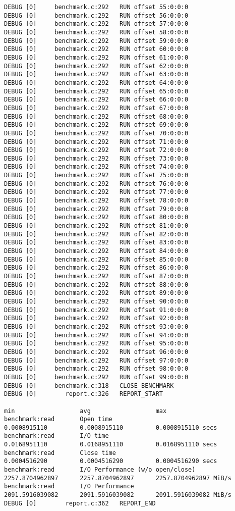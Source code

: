 \begin{verbatim}
DEBUG [0]     benchmark.c:292   RUN offset 55:0:0:0
DEBUG [0]     benchmark.c:292   RUN offset 56:0:0:0
DEBUG [0]     benchmark.c:292   RUN offset 57:0:0:0
DEBUG [0]     benchmark.c:292   RUN offset 58:0:0:0
DEBUG [0]     benchmark.c:292   RUN offset 59:0:0:0
DEBUG [0]     benchmark.c:292   RUN offset 60:0:0:0
DEBUG [0]     benchmark.c:292   RUN offset 61:0:0:0
DEBUG [0]     benchmark.c:292   RUN offset 62:0:0:0
DEBUG [0]     benchmark.c:292   RUN offset 63:0:0:0
DEBUG [0]     benchmark.c:292   RUN offset 64:0:0:0
DEBUG [0]     benchmark.c:292   RUN offset 65:0:0:0
DEBUG [0]     benchmark.c:292   RUN offset 66:0:0:0
DEBUG [0]     benchmark.c:292   RUN offset 67:0:0:0
DEBUG [0]     benchmark.c:292   RUN offset 68:0:0:0
DEBUG [0]     benchmark.c:292   RUN offset 69:0:0:0
DEBUG [0]     benchmark.c:292   RUN offset 70:0:0:0
DEBUG [0]     benchmark.c:292   RUN offset 71:0:0:0
DEBUG [0]     benchmark.c:292   RUN offset 72:0:0:0
DEBUG [0]     benchmark.c:292   RUN offset 73:0:0:0
DEBUG [0]     benchmark.c:292   RUN offset 74:0:0:0
DEBUG [0]     benchmark.c:292   RUN offset 75:0:0:0
DEBUG [0]     benchmark.c:292   RUN offset 76:0:0:0
DEBUG [0]     benchmark.c:292   RUN offset 77:0:0:0
DEBUG [0]     benchmark.c:292   RUN offset 78:0:0:0
DEBUG [0]     benchmark.c:292   RUN offset 79:0:0:0
DEBUG [0]     benchmark.c:292   RUN offset 80:0:0:0
DEBUG [0]     benchmark.c:292   RUN offset 81:0:0:0
DEBUG [0]     benchmark.c:292   RUN offset 82:0:0:0
DEBUG [0]     benchmark.c:292   RUN offset 83:0:0:0
DEBUG [0]     benchmark.c:292   RUN offset 84:0:0:0
DEBUG [0]     benchmark.c:292   RUN offset 85:0:0:0
DEBUG [0]     benchmark.c:292   RUN offset 86:0:0:0
DEBUG [0]     benchmark.c:292   RUN offset 87:0:0:0
DEBUG [0]     benchmark.c:292   RUN offset 88:0:0:0
DEBUG [0]     benchmark.c:292   RUN offset 89:0:0:0
DEBUG [0]     benchmark.c:292   RUN offset 90:0:0:0
DEBUG [0]     benchmark.c:292   RUN offset 91:0:0:0
DEBUG [0]     benchmark.c:292   RUN offset 92:0:0:0
DEBUG [0]     benchmark.c:292   RUN offset 93:0:0:0
DEBUG [0]     benchmark.c:292   RUN offset 94:0:0:0
DEBUG [0]     benchmark.c:292   RUN offset 95:0:0:0
DEBUG [0]     benchmark.c:292   RUN offset 96:0:0:0
DEBUG [0]     benchmark.c:292   RUN offset 97:0:0:0
DEBUG [0]     benchmark.c:292   RUN offset 98:0:0:0
DEBUG [0]     benchmark.c:292   RUN offset 99:0:0:0
DEBUG [0]     benchmark.c:318   CLOSE_BENCHMARK
DEBUG [0]        report.c:326   REPORT_START
                                                                               min                  avg                  max
benchmark:read       Open time                                        0.0008915110         0.0008915110         0.0008915110 secs
benchmark:read       I/O time                                         0.0168951110         0.0168951110         0.0168951110 secs
benchmark:read       Close time                                       0.0004516290         0.0004516290         0.0004516290 secs
benchmark:read       I/O Performance (w/o open/close)              2257.8704962897      2257.8704962897      2257.8704962897 MiB/s
benchmark:read       I/O Performance                               2091.5916039082      2091.5916039082      2091.5916039082 MiB/s
DEBUG [0]        report.c:362   REPORT_END


\end{verbatim}
